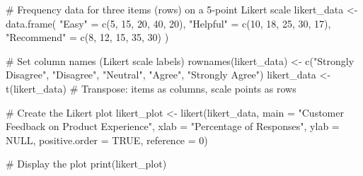 \documentclass[
  letterpaper,
  DIV=11,
  numbers=noendperiod]{scrartcl}
\newenvironment{Shaded}{\begin{snugshade}}{\end{snugshade}}
\newcommand{\AttributeTok}[1]{\textcolor[rgb]{0.40,0.45,0.13}{#1}}
\newcommand{\CommentTok}[1]{\textcolor[rgb]{0.37,0.37,0.37}{#1}}
\newcommand{\ConstantTok}[1]{\textcolor[rgb]{0.56,0.35,0.01}{#1}}
\newcommand{\DecValTok}[1]{\textcolor[rgb]{0.68,0.00,0.00}{#1}}
\newcommand{\FunctionTok}[1]{\textcolor[rgb]{0.28,0.35,0.67}{#1}}
\newcommand{\NormalTok}[1]{\textcolor[rgb]{0.00,0.23,0.31}{#1}}
\newcommand{\OtherTok}[1]{\textcolor[rgb]{0.00,0.23,0.31}{#1}}
\newcommand{\StringTok}[1]{\textcolor[rgb]{0.13,0.47,0.30}{#1}}
\begin{document}
\begin{Shaded}
\begin{Highlighting}[]
\CommentTok{\# Frequency data for three items (rows) on a 5{-}point Likert scale}
\NormalTok{likert\_data }\OtherTok{\textless{}{-}} \FunctionTok{data.frame}\NormalTok{(}
  \StringTok{"Easy"} \OtherTok{=} \FunctionTok{c}\NormalTok{(}\DecValTok{5}\NormalTok{, }\DecValTok{15}\NormalTok{, }\DecValTok{20}\NormalTok{, }\DecValTok{40}\NormalTok{, }\DecValTok{20}\NormalTok{),}
  \StringTok{"Helpful"} \OtherTok{=} \FunctionTok{c}\NormalTok{(}\DecValTok{10}\NormalTok{, }\DecValTok{18}\NormalTok{, }\DecValTok{25}\NormalTok{, }\DecValTok{30}\NormalTok{, }\DecValTok{17}\NormalTok{),}
  \StringTok{"Recommend"} \OtherTok{=} \FunctionTok{c}\NormalTok{(}\DecValTok{8}\NormalTok{, }\DecValTok{12}\NormalTok{, }\DecValTok{15}\NormalTok{, }\DecValTok{35}\NormalTok{, }\DecValTok{30}\NormalTok{)}
\NormalTok{)}

\CommentTok{\# Set column names (Likert scale labels)}
\FunctionTok{rownames}\NormalTok{(likert\_data) }\OtherTok{\textless{}{-}} \FunctionTok{c}\NormalTok{(}\StringTok{"Strongly Disagree"}\NormalTok{, }\StringTok{"Disagree"}\NormalTok{, }\StringTok{"Neutral"}\NormalTok{, }\StringTok{"Agree"}\NormalTok{, }\StringTok{"Strongly Agree"}\NormalTok{)}
\NormalTok{likert\_data }\OtherTok{\textless{}{-}} \FunctionTok{t}\NormalTok{(likert\_data)  }\CommentTok{\# Transpose: items as columns, scale points as rows}

\CommentTok{\# Create the Likert plot}
\NormalTok{likert\_plot }\OtherTok{\textless{}{-}} \FunctionTok{likert}\NormalTok{(likert\_data,}
                      \AttributeTok{main =} \StringTok{"Customer Feedback on Product Experience"}\NormalTok{,}
                      \AttributeTok{xlab =} \StringTok{"Percentage of Responses"}\NormalTok{,}
                      \AttributeTok{ylab =} \ConstantTok{NULL}\NormalTok{,}
                      \AttributeTok{positive.order =} \ConstantTok{TRUE}\NormalTok{,}
                      \AttributeTok{reference =} \DecValTok{0}\NormalTok{)}

\CommentTok{\# Display the plot}
\FunctionTok{print}\NormalTok{(likert\_plot)}
\end{Highlighting}
\end{Shaded}
\end{document}
